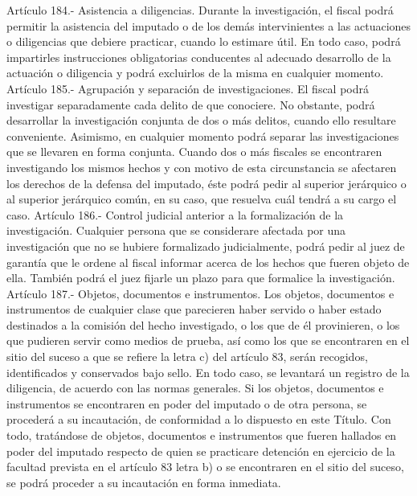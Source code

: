     Artículo 184.- Asistencia a diligencias. Durante la investigación, el fiscal podrá permitir la asistencia del imputado o de los demás intervinientes a las actuaciones o diligencias que debiere practicar, cuando lo estimare útil. En todo caso, podrá impartirles instrucciones obligatorias conducentes al adecuado desarrollo de la actuación o diligencia y podrá excluirlos de la misma en cualquier momento.
    Artículo 185.- Agrupación y separación de investigaciones. El fiscal podrá investigar separadamente cada delito de que conociere. No obstante, podrá desarrollar la investigación conjunta de dos o más delitos, cuando ello resultare conveniente. Asimismo, en cualquier momento podrá separar las investigaciones que se llevaren en forma conjunta.
    Cuando dos o más fiscales se encontraren investigando los mismos hechos y con motivo de esta circunstancia se afectaren los derechos de la defensa del imputado, éste podrá pedir al superior jerárquico o al superior jerárquico común, en su caso, que resuelva cuál tendrá a su cargo el caso.
    Artículo 186.- Control judicial anterior a la formalización de la investigación. Cualquier persona que se considerare afectada por una investigación que no se hubiere formalizado judicialmente, podrá pedir al juez de garantía que le ordene al fiscal informar acerca de los hechos que fueren objeto de ella. También podrá el juez fijarle un plazo para que formalice la investigación.
    Artículo 187.- Objetos, documentos e instrumentos. Los objetos, documentos e instrumentos de cualquier clase que parecieren haber servido o haber estado destinados a la comisión del hecho investigado, o los que de él provinieren, o los que pudieren servir como medios de prueba, así como los que se encontraren en el sitio del suceso a que se refiere la letra c) del artículo 83, serán recogidos, identificados y conservados bajo sello. En todo caso, se levantará un registro de la diligencia, de acuerdo con las normas generales.
    Si los objetos, documentos e instrumentos se encontraren en poder del imputado o de otra persona, se procederá a su incautación, de conformidad a lo dispuesto en este Título. Con todo, tratándose de objetos, documentos e instrumentos que fueren hallados en poder del imputado respecto de quien se practicare detención en ejercicio de la facultad prevista en el artículo 83 letra b) o se encontraren en el sitio del suceso, se podrá proceder a su incautación en forma inmediata.



